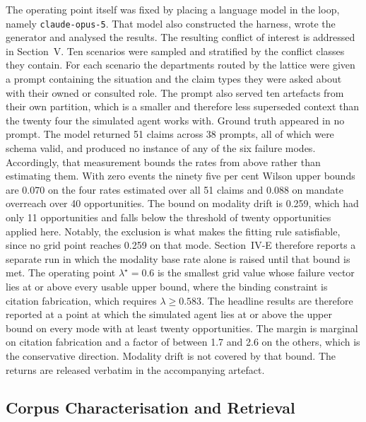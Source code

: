 \documentclass[journal]{IEEEtran}
\begin{document}
The operating point itself was fixed by placing a language model in the loop, namely \texttt{claude-opus-5}. That model also constructed the harness, wrote the generator and analysed the results. The resulting conflict of interest is addressed in Section~V. Ten scenarios were sampled and stratified by the conflict classes they contain. For each scenario the departments routed by the lattice were given a prompt containing the situation and the claim types they were asked about with their owned or consulted role. The prompt also served ten artefacts from their own partition, which is a smaller and therefore less superseded context than the twenty four the simulated agent works with. Ground truth appeared in no prompt. The model returned 51 claims across 38 prompts, all of which were schema valid, and produced no instance of any of the six failure modes. Accordingly, that measurement bounds the rates from above rather than estimating them. With zero events the ninety five per cent Wilson upper bounds are 0.070 on the four rates estimated over all 51 claims and 0.088 on mandate overreach over 40 opportunities. The bound on modality drift is 0.259, which had only 11 opportunities and falls below the threshold of twenty opportunities applied here. Notably, the exclusion is what makes the fitting rule satisfiable, since no grid point reaches 0.259 on that mode. Section~IV-E therefore reports a separate run in which the modality base rate alone is raised until that bound is met. The operating point $\lambda^\star=0.6$ is the smallest grid value whose failure vector lies at or above every usable upper bound, where the binding constraint is citation fabrication, which requires $\lambda\ge0.583$. The headline results are therefore reported at a point at which the simulated agent lies at or above the upper bound on every mode with at least twenty opportunities. The margin is marginal on citation fabrication and a factor of between 1.7 and 2.6 on the others, which is the conservative direction. Modality drift is not covered by that bound. The returns are released verbatim in the accompanying artefact.

\subsection{Corpus Characterisation and Retrieval}
\end{document}
